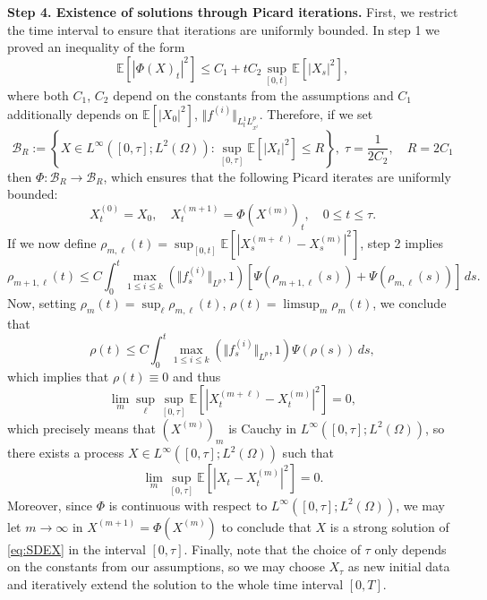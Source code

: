 \documentclass[10pt,oneside]{amsart}
\numberwithin{equation}{section}
\numberwithin{definition}{section}
\numberwithin{theorem}{section}
\numberwithin{lemma}{section}
\begin{document}
\textbf{Step 4. Existence of solutions through Picard iterations.} First, we restrict the time interval to ensure that iterations are uniformly bounded. In step 1 we proved an inequality of the form%
\begin{equation*}
  \mathbb{E}\left[\left|\Phi(X)_{t}\right|^{2}\right]\leq C_{1}+tC_{2}\sup_{[0,t]}\mathbb{E}\left[|X_{s}|^{2}\right],
\end{equation*}
%
where both $C_{1}$, $C_{2}$ depend on the constants from the assumptions and $C_{1}$ additionally depends on $\mathbb{E}\left[|X_{0}|^{2}\right]$, $\Vert f^{(i)}\Vert _{L^{1}_tL^p_{x^i}}$. Therefore, if we set
%
\begin{equation*}
  \mathcal{B}_{R}:=\left\{ X\in L^{\infty}\left([0,\tau];L^{2}(\Omega)\right):\sup_{[0,\tau]}\mathbb{E}\left[|X_{t}|^{2}\right]\leq R\right\} ,\;\tau=\frac{1}{2C_{2}},\quad R=2C_{1}
\end{equation*}
%
then $\Phi:\mathcal{B}_{R}\longrightarrow\mathcal{B}_{R}$, which ensures that the following Picard iterates are uniformly bounded:
%
\begin{equation*}
  X_{t}^{(0)}=X_{0},\quad X_{t}^{(m+1)}=\Phi(X^{(m)})_{t},\quad0\leq t\leq\tau.
\end{equation*}
%
If we now define $\rho_{m,\ell}(t)=\sup_{[0,t]}\mathbb{E}\left[\left|X_{s}^{(m+\ell)}-X_{s}^{(m)}\right|^{2}\right]$, step 2 implies
%
\begin{equation*}
  \rho_{m+1,\ell}(t)\leq C\int_{0}^{t}\max_{1\leq i\leq k}(\Vert f_{s}^{(i)}\Vert_{L^p},1)\left[\Psi\left(\rho_{m+1,\ell}(s)\right)+\Psi\left(\rho_{m,\ell}(s)\right)\right]\,ds.
\end{equation*}
%
Now, setting $\rho_{m}(t)=\sup_{\ell}\rho_{m,\ell}(t)$, $\rho(t)=\limsup_{m}\rho_{m}(t)$, we conclude that
%
\begin{equation*}
  \rho(t)\leq C\int_{0}^{t}\max_{1\leq i\leq k}(\Vert f_{s}^{(i)}\Vert_{L^p},1)\Psi\left(\rho(s)\right)\,ds,
\end{equation*}
%
which implies that $\rho(t)\equiv 0$ and thus
%
\begin{equation*}
  \lim_{m}\sup_{\ell}\sup_{[0,\tau]}\mathbb{E}\left[|X_{t}^{(m+\ell)}-X_{t}^{(m)}|^{2}\right]=0,
\end{equation*}
%
which precisely means that $\left(X^{(m)}\right)_{m}$ is Cauchy in $L^{\infty}\left([0,\tau];L^{2}(\Omega)\right)$, so there exists a process ${X\in L^{\infty}\left([0,\tau];L^{2}(\Omega)\right)}$ such that
%
\begin{equation*}
  \lim_{m}\sup_{[0,\tau]}\mathbb{E}\left[|X_{t}-X_{t}^{(m)}|^{2}\right]=0.
\end{equation*}
%
Moreover, since $\Phi$  is continuous with respect to $L^{\infty}\left([0,\tau];L^{2}(\Omega)\right)$, we may let $m\to\infty$ in $X^{(m+1)}=\Phi(X^{(m)})$ to conclude that $X$ is a strong solution of \cref{eq:SDEX} in the interval $[0,\tau]$. Finally, note that the choice of $\tau$  only depends on the constants from our assumptions, so we may choose $X_{\tau}$ as new initial data and iteratively extend the solution to the whole time interval $[0,T]$.
\end{document}

